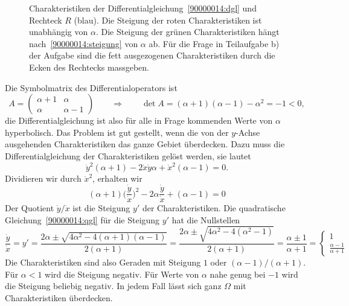 \begin{loesung}
\begin{figure}
\centering
{}
\caption{Charakteristiken der Differentialgleichung~\eqref{90000014:dgl}
und Rechteck $R$ (blau). 
Die Steigung der roten Charakteristiken ist unabhängig von $\alpha$.
Die Steigung der grünen Charakteristiken hängt nach~\eqref{90000014:steigung}
von $\alpha$ ab.
Für die Frage in Teilaufgabe b) der Aufgabe sind die fett ausgezogenen
Charakteristiken durch die Ecken des Rechtecks massgeben.
\label{90000014:domain}}
\end{figure}
\begin{teilaufgaben}
\item
Die Symbolmatrix des Differentialoperators ist
\[
A=\begin{pmatrix}\alpha+1&\alpha \\ \alpha&\alpha - 1\end{pmatrix}
\qquad\Rightarrow\qquad
\det A=(\alpha + 1)(\alpha - 1) - \alpha^2=-1<0,
\]
die Differentialgleichung ist also für alle in Frage kommenden
Werte von $\alpha$ hyperbolisch.
Das Problem ist gut gestellt, wenn die von der $y$-Achse ausgehenden
Charakteristiken das ganze Gebiet überdecken. 
Dazu muss die Differentialgleichung der Charakteristiken gelöst werden,
sie lautet
\[
\dot y^2
(\alpha + 1)
-2
\dot x\dot y
\alpha
+
\dot x^2
(\alpha - 1)
=0.
\]
Dividieren wir durch $\dot x^2$, erhalten wir
\begin{equation}
(\alpha + 1)
\biggl(\frac{\dot y}{\dot x}\biggr)^2
-2\alpha \frac{\dot y}{\dot x} +(\alpha - 1)=0
\label{90000014:qgl}
\end{equation}
Der Quotient $\dot y/\dot x$ ist die Steigung $y'$ der Charakteristiken.
Die quadratische Gleichung~\eqref{90000014:qgl} für die Steigung $y'$
hat die Nullstellen
\begin{equation}
\frac{\dot y}{\dot x}=y'=
\frac{2\alpha \pm \sqrt{4\alpha^2 - 4(\alpha+1)(\alpha - 1)}}{2(\alpha +1)}
=
\frac{2\alpha \pm \sqrt{4\alpha^2 - 4(\alpha^2 - 1)}}{2(\alpha + 1)}
=
\frac{\alpha \pm 1}{\alpha + 1}
=
\begin{cases}
1&\\
\displaystyle\frac{\alpha - 1}{\alpha + 1}
\end{cases}
\label{90000014:steigung}
\end{equation}
Die Charakteristiken sind also Geraden mit Steigung $1$ oder
$(\alpha - 1)/(\alpha + 1)$.
Für $\alpha < 1$ wird die Steigung negativ.
Für Werte von $\alpha$ nahe genug bei $-1$ wird die Steigung beliebig
negativ.
In jedem Fall lässt sich ganz $\Omega$ mit Charakteristiken überdecken.


\end{teilaufgaben}
\end{loesung}
